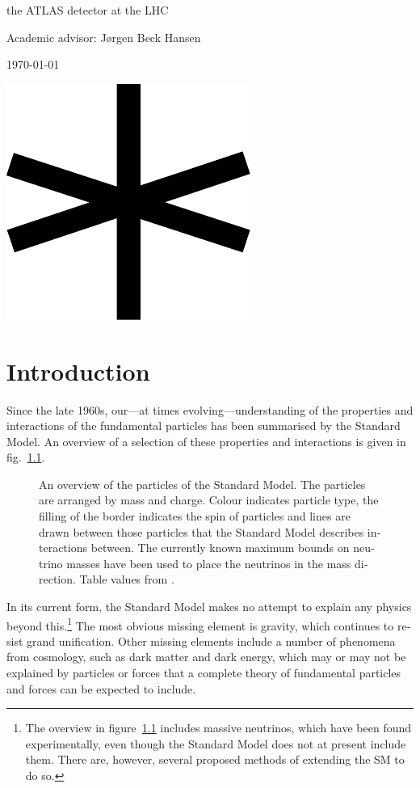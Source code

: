 \begin{english}
\begin{titlingpage}
{{{the ATLAS detector at the LHC}
\vspace{7em}

{\Large Academic advisor: Jørgen Beck Hansen}
\vfill

\today}
\clearpage}
\thispagestyle{empty}
  \phantom{p}
\vspace{1.16\textwidth}

\begin{center}
\includegraphics[width=.1\textwidth]{star1}
\end{center}
\clearpage
\end{titlingpage}
\frontmatter

\tableofcontents
\mainmatter

\chapter{Introduction}

Since the late 1960s, our---at times evolving---understanding of the properties and interactions of the fundamental particles has been summarised by the Standard Model. An overview of a selection of these properties and interactions is given in fig.~\ref{SMsum}.

\begin{figure}[htp]
\begin{minipage}[b]{.74\textwidth}

\end{minipage}
\hfill\begin{minipage}[b]{.25\textwidth}
\caption{An overview of the particles of the Standard Model. The particles are arranged by mass and charge. Colour indicates particle type, the filling of the border indicates the spin of particles and lines are drawn between those particles that the Standard Model describes interactions between. The currently known maximum bounds on neutrino masses have been used to place the neutrinos in the mass direction. Table values from \cite{wikism}.\label{SMsum}}
\end{minipage}
\end{figure}

In its current form, the Standard Model makes no attempt to explain any physics beyond this.\footnote{The overview in figure~\ref{SMsum} includes massive neutrinos, which have been found experimentally, even though the Standard Model does not at present include them. There are, however, several proposed methods of extending the SM to do so.} The most obvious missing element is gravity, which continues to resist grand unification. Other missing elements include a number of phenomena from cosmology, such as dark matter and dark energy, which may or may not be explained by particles or forces that a complete theory of fundamental particles and forces can be expected to include.


\end{english}
